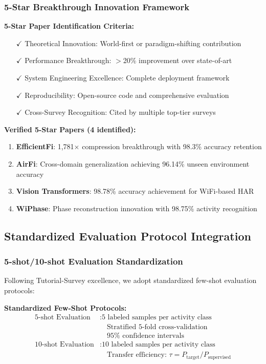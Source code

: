 \documentclass[journal]{IEEEtran}
\begin{document}
\subsubsection{5-Star Breakthrough Innovation Framework}
\textbf{5-Star Paper Identification Criteria:}
\begin{itemize}
\item[$\checkmark$] Theoretical Innovation: World-first or paradigm-shifting contribution
\item[$\checkmark$] Performance Breakthrough: $>$20\% improvement over state-of-art
\item[$\checkmark$] System Engineering Excellence: Complete deployment framework
\item[$\checkmark$] Reproducibility: Open-source code and comprehensive evaluation
\item[$\checkmark$] Cross-Survey Recognition: Cited by multiple top-tier surveys
\end{itemize}

\textbf{Verified 5-Star Papers (4 identified):}
\begin{enumerate}
\item \textbf{EfficientFi}: 1,781$\times$ compression breakthrough with 98.3\% accuracy retention
\item \textbf{AirFi}: Cross-domain generalization achieving 96.14\% unseen environment accuracy
\item \textbf{Vision Transformers}: 98.78\% accuracy achievement for WiFi-based HAR
\item \textbf{WiPhase}: Phase reconstruction innovation with 98.75\% activity recognition
\end{enumerate}

\subsection{Standardized Evaluation Protocol Integration}

\subsubsection{5-shot/10-shot Evaluation Standardization}
Following Tutorial-Survey excellence, we adopt standardized few-shot evaluation protocols:

\textbf{Standardized Few-Shot Protocols:}
\begin{align}
\text{5-shot Evaluation} &: \text{5 labeled samples per activity class} \nonumber \\
&\quad \text{Stratified 5-fold cross-validation} \nonumber \\
&\quad 95\% \text{ confidence intervals} \nonumber \\
\text{10-shot Evaluation} &: \text{10 labeled samples per activity class} \nonumber \\
&\quad \text{Transfer efficiency: } \tau = P_{\text{target}} / P_{\text{supervised}}
\label{eq:few_shot}
\end{align}
\end{document}
